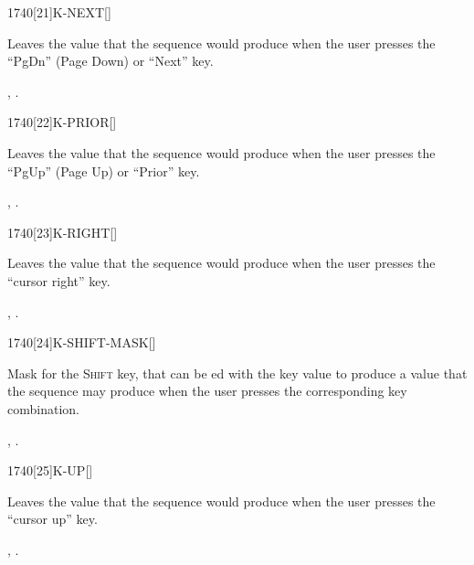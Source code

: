 \begin{worddef}{1740}[21]{K-NEXT}[]%
\item {}

	Leaves the value  that the sequence 
	 would produce when the user presses the
	``PgDn'' (Page Down) or ``Next'' key.

\see {},
	.
\end{worddef}


\begin{worddef}{1740}[22]{K-PRIOR}[]%
\item {}

	Leaves the value  that the sequence 
	 would produce when the user presses the
	``PgUp'' (Page Up) or ``Prior'' key.

\see {},
	.
\end{worddef}


\begin{worddef}{1740}[23]{K-RIGHT}[]%
\item {}

	Leaves the value  that the sequence 
	 would produce when the user presses the
	``cursor right'' key.

\see {},
	.
\end{worddef}


\begin{worddef}{1740}[24]{K-SHIFT-MASK}[]%
\item {}

	Mask for the \textsc{Shift} key, that can be ed with the
	key value to produce a value that the sequence 
	 may produce when the user presses the
	corresponding key combination.

\see {},
	.
\end{worddef}


\begin{worddef}{1740}[25]{K-UP}[]%
\item {}

	Leaves the value  that the sequence 
	 would produce when the user presses the
	``cursor up'' key.

\see {},
	.
\end{worddef}


